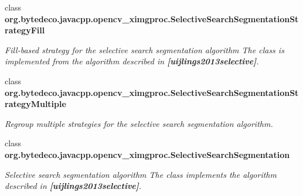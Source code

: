 \begin{DoxyCompactItemize}
class {\bfseries org.\+bytedeco.\+javacpp.\+opencv\+\_\+ximgproc.\+Selective\+Search\+Segmentation\+Strategy\+Fill}
\begin{DoxyCompactList}\small\item\em Fill-\/based strategy for the selective search segmentation algorithm The class is implemented from the algorithm described in {\bfseries [uijlings2013selective]}. \end{DoxyCompactList}\item 
class {\bfseries org.\+bytedeco.\+javacpp.\+opencv\+\_\+ximgproc.\+Selective\+Search\+Segmentation\+Strategy\+Multiple}
\begin{DoxyCompactList}\small\item\em Regroup multiple strategies for the selective search segmentation algorithm. \end{DoxyCompactList}\item 
class {\bfseries org.\+bytedeco.\+javacpp.\+opencv\+\_\+ximgproc.\+Selective\+Search\+Segmentation}
\begin{DoxyCompactList}\small\item\em Selective search segmentation algorithm The class implements the algorithm described in {\bfseries [uijlings2013selective]}. \end{DoxyCompactList}\end{DoxyCompactItemize}
